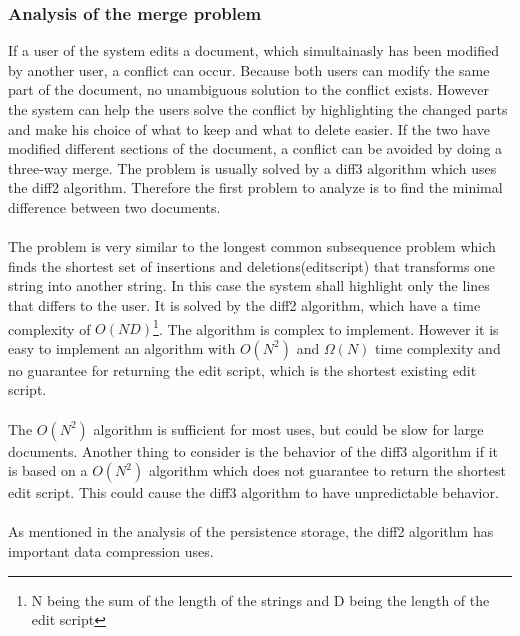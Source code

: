 \documentclass[a4paper,11pt,report]{report}
\begin{document}
		\subsubsection{Analysis of the merge problem}
		If a user of the system edits a document, which simultainasly has been modified by another user, a conflict can occur. Because both users can modify the same part of the document, no unambiguous solution to the conflict exists. However the system can help the 			users solve the conflict by highlighting the changed parts and make his choice of what to keep and what to delete easier. If the two have modified different sections of the document, a conflict can be avoided by doing a three-way merge. The problem is usually 			solved by a diff3 algorithm which uses the diff2 algorithm. Therefore the first problem to analyze is to find the minimal difference between two documents. \\ \\
		The problem is very similar to the longest common subsequence problem which finds the shortest set of insertions and deletions(editscript) that transforms one string into another string. In this case the system shall highlight only the lines that differs to the user. It is 			solved by the diff2 algorithm, which have a time complexity of \begin{math}O(ND)\end{math}\cite{Eugene}\footnote[2]{N being the sum of the length of the strings and D being the length of the edit script}. The algorithm is complex to implement. However it is easy 			to implement an algorithm with \begin{math}O(N^2)\end{math} and \begin{math} \Omega (N)\end{math} time complexity and no guarantee for returning the edit script, which is the shortest existing edit script. \\ \\
		The \begin{math}O(N^2)\end{math} algorithm is sufficient for most uses, but could be slow for large documents. Another thing to consider is the behavior of the diff3 algorithm if it is based on a \begin{math}O(N^2)\end{math} algorithm which does not guarantee      		to return the shortest edit script. This could cause the diff3 algorithm to have unpredictable behavior. \\ \\
		As mentioned in the analysis of the persistence storage, the diff2 algorithm has important data compression uses.
\end{document}

